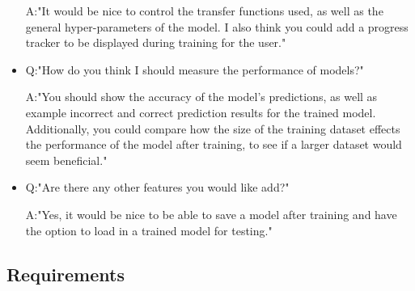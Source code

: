 \documentclass[./project-report/src/latex/project-report.tex]{subfiles}
\begin{document}
\begin{itemize}
          A:"It would be nice to control the transfer functions used, as well as the general hyper-parameters of the model. I also think you could add a progress tracker 
             to be displayed during training for the user."
    \item Q:"How do you think I should measure the performance of models?"

          A:"You should show the accuracy of the model's predictions, as well as example incorrect and correct prediction results for the trained model. Additionally, 
             you could compare how the size of the training dataset effects the performance of the model after training, to see if a larger dataset would seem 
             beneficial."
    \item Q:"Are there any other features you would like add?"

          A:"Yes, it would be nice to be able to save a model after training and have the option to load in a trained model for testing."
\end{itemize}

\subsection{Requirements}
\end{document}
